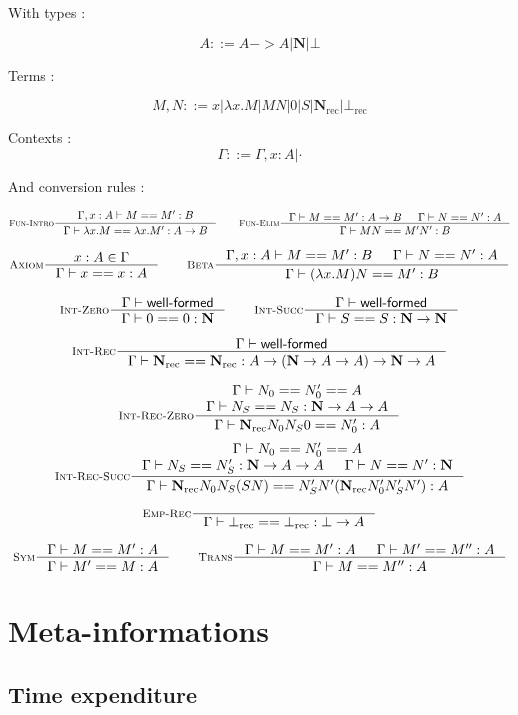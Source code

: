 \documentclass{article}
\DeclareMathOperator{\rec}{rec}
\newcommand{\0}{\mathbf{0}}
\newcommand{\1}{\mathbf{1}}
\newcommand{\nat}{\mathbf{N}}
\newcommand{\Wf}{\textsf{well-formed}}
\begin{document}
With types :

$$ A ::= A -> A | \nat | \bot $$

Terms :

$$ M,N ::= x | \lambda x. M | MN | 0 | S | \nat_{\rec} | \bot_{\rec} $$


Contexts :
$$ \Gamma ::= \Gamma, x : A | \cdot $$

And conversion rules :


$$
    \inference[\textsc{Fun-Intro}]{\Gamma, x : A |- M == M' : B }{\Gamma |- \lambda x. M == \lambda x. M' : A -> B} \qquad
    \inference[\textsc{Fun-Elim}]{\Gamma |- M == M' : A -> B& \Gamma |- N == N' : A}{\Gamma |- MN == M'N' : B}
$$

$$
    \inference[\textsc{Axiom}]{x : A \in \Gamma }{\Gamma |- x == x : A} \qquad
    \inference[\textsc{Beta}]{\Gamma, x : A |- M == M' : B & \Gamma |- N == N' : A}{\Gamma |- (\lambda x. M)N == M' : B}
$$

$$
    \inference[\textsc{Int-Zero}]{\Gamma |- \Wf}{\Gamma |- 0 == 0 : \nat} \qquad
    \inference[\textsc{Int-Succ}]{\Gamma |- \Wf}{\Gamma |- S == S : \nat -> \nat}
$$

$$
    \inference[\textsc{Int-Rec}]{\Gamma |- \Wf}{\Gamma |- \nat_{\rec} == \nat_{\rec} : A \to \left(\nat -> A -> A \right) -> \nat -> A}
$$


$$
    \inference[\textsc{Int-Rec-Zero}]{\Gamma |- N_0 == N'_0 == A\\ \Gamma |- N_S == N_S : \nat -> A  -> A}{\Gamma |- \nat_{\rec} N_0N_S0 == N'_0 : A}
$$
$$
    \inference[\textsc{Int-Rec-Succ}]{\Gamma |- N_0 == N'_0 == A\\ \Gamma |- N_S == N'_S : \nat -> A  -> A & \Gamma |- N == N' :\nat}{\Gamma |- \nat_{\rec} N_0N_S (S N) == N'_S N' (\nat_{\rec}N'_0 N'_S N') : A}
$$


$$
    \inference[\textsc{Emp-Rec}]{}{\Gamma |- \bot_{\rec} == \bot_{\rec} : \bot -> A}
$$

$$
    \inference[\textsc{Sym}]{\Gamma |- M == M' : A}{\Gamma |- M' == M : A} \qquad
    \inference[\textsc{Trans}]
    {\Gamma |- M == M' :A & \Gamma |- M' == M'' : A}{\Gamma |- M == M'' : A}
$$


\section{Meta-informations}

\subsection{Time expenditure}
\end{document}

